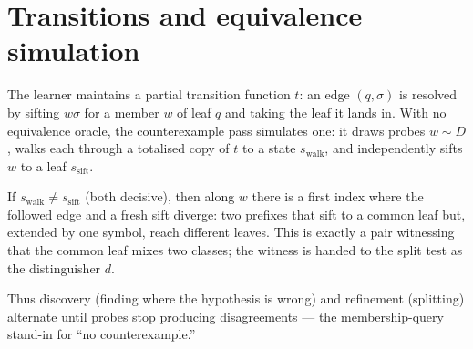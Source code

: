 \section{Transitions and equivalence simulation}

The learner maintains a partial transition function $t$: an edge $(q,\sigma)$
is resolved by sifting $w\sigma$ for a member $w$ of leaf $q$ and taking the leaf
it lands in. With no equivalence oracle, the counterexample pass simulates
one: it draws probes $w\sim D$, walks each through a totalised copy of $t$
to a state $s_{\mathrm{walk}}$, and independently sifts $w$ to a leaf
$s_{\mathrm{sift}}$.

\begin{lemma}\label{lem:cex}
If $s_{\mathrm{walk}}\ne s_{\mathrm{sift}}$ (both decisive), then along $w$ there
is a first index where the followed edge and a fresh sift diverge: two prefixes
that sift to a common leaf but, extended by one symbol, reach different leaves.
This is exactly a pair witnessing that the common leaf mixes two classes; the
witness is handed to the split test as the distinguisher $d$.
\end{lemma}

Thus discovery (finding where the hypothesis is wrong) and refinement (splitting)
alternate until probes stop producing disagreements --- the membership-query
stand-in for ``no counterexample.''
